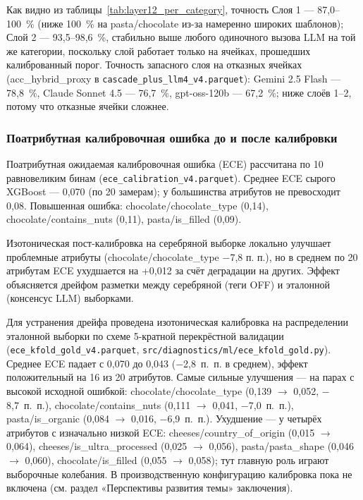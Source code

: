 Как видно из таблицы~\ref{tab:layer12_per_category}, точность Слоя 1 --- 87,0--100~\% (ниже 100~\% на pasta/chocolate из-за намеренно широких шаблонов); Слой 2 --- 93,5--98,6~\%, стабильно выше любого одиночного вызова LLM на той же категории, поскольку слой работает только на ячейках, прошедших калиброванный порог. Точность запасного слоя на отказных ячейках (acc\_hybrid\_proxy в \texttt{cascade\_plus\_llm4\_v4.parquet}): Gemini 2.5 Flash --- 78,8~\%, Claude Sonnet 4.5 --- 76,7~\%, gpt-oss-120b --- 67,2~\%; ниже слоёв 1--2, потому что отказные ячейки сложнее.

\subsubsection{Поатрибутная калибровочная ошибка до и после калибровки}
\label{subsec:calibration}

Поатрибутная ожидаемая калибровочная ошибка (ECE) рассчитана по 10 равновеликим бинам (\texttt{ece\_calibration\_v4.parquet}). Среднее ECE сырого XGBoost — 0,070 (по 20 замерам); у большинства атрибутов не превосходит 0,08. Повышенная ошибка: chocolate/chocolate\_type (0,14), chocolate/contains\_nuts (0,11), pasta/is\_filled (0,09).

Изотоническая пост-калибровка на серебряной выборке локально улучшает проблемные атрибуты (chocolate/chocolate\_type −7,8 п. п.), но в среднем по 20 атрибутам ECE ухудшается на +0,012 за счёт деградации на других. Эффект объясняется дрейфом разметки между серебряной (теги OFF) и эталонной (консенсус LLM) выборками.

Для устранения дрейфа проведена изотоническая калибровка на распределении эталонной выборки по схеме 5-кратной перекрёстной валидации (\texttt{ece\_kfold\_gold\_v4.parquet}, \texttt{src/diagnostics/ml/ece\_kfold\_gold.py}). Среднее ECE падает с 0,070 до 0,043 ($-$2,8~п.~п. в среднем), эффект положительный на 16 из 20 атрибутов. Самые сильные улучшения --- на парах с высокой исходной ошибкой: chocolate/chocolate\_type (0,139 $\to$ 0,052, $-$8,7~п.~п.), chocolate/contains\_nuts (0,111 $\to$ 0,041, $-$7,0~п.~п.), pasta/is\_organic (0,084 $\to$ 0,016, $-$6,9~п.~п.). Ухудшение --- у четырёх атрибутов с изначально низкой ECE: cheeses/country\_of\_origin (0,015 $\to$ 0,064), cheeses/is\_ultra\_processed (0,025 $\to$ 0,056), pasta/pasta\_shape (0,046 $\to$ 0,060), chocolate/is\_filled (0,055 $\to$ 0,058); тут главную роль играют выборочные колебания. В производственную конфигурацию калибровка пока не включена (см. раздел «Перспективы развития темы» заключения).

